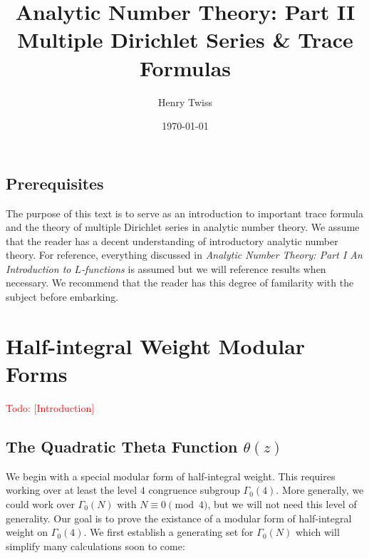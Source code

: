 \documentclass[12pt]{book}
\title{Analytic Number Theory: Part II \\  Multiple Dirichlet Series \& Trace Formulas}
\author{Henry Twiss}
\date{\today}
\theoremstyle{definition}\newframedtheorem{method}{Method}
\renewcommand{\t}{\theta}
\newcommand{\G}{\Gamma}
\newcommand{\<}{\langle}
\renewcommand{\>}{\rangle}
\newcommand{\todo}[1]{\textcolor{red}{\sf Todo: [#1]}}
\begin{document}
\maketitle
\thispagestyle{fancy}

\newpage

\section*{Prerequisites}
  The purpose of this text is to serve as an introduction to important trace formula and the theory of multiple Dirichlet series in analytic number theory. We assume that the reader has a decent understanding of introductory analytic number theory. For reference, everything discussed in \textit{Analytic Number Theory: Part I An Introduction to $L$-functions} is assumed but we will reference results when necessary. We recommend that the reader has this degree of familarity with the subject before embarking.

\newpage

\tableofcontents

\newpage

\chapter{Half-integral Weight Modular Forms}
  \todo{Introduction}
  \section{The Quadratic Theta Function \texorpdfstring{$\t(z)$}{O(z)}}
    We begin with a special modular form of half-integral weight. This requires working over at least the level $4$ congruence subgroup $\G_{0}(4)$. More generally, we could work over $\G_{0}(N)$ with $N \equiv 0 \pmod{4}$, but we will not need this level of generality. Our goal is to prove the existance of a modular form of half-integral weight on $\G_{0}(4)$. We first establish a generating set for $\G_{0}(N)$ which will simplify many calculations soon to come:
\end{document}
